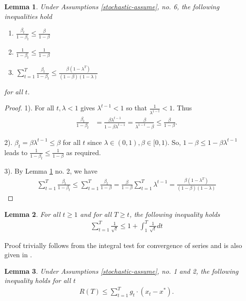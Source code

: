 \documentclass{article}
\newtheorem{lemma}{Lemma}
\begin{document}
\begin{lemma} \label{beta-bounds}
Under Assumptions \ref{stochastic-assume}, no. 6, the following inequalities hold
\begin{enumerate}
\item $\displaystyle \frac{\beta_t}{1-\beta_t} \leq \frac{\beta}{1-\beta}$
\item $\displaystyle \frac{1}{1-\beta_t} \leq \frac{1}{1-\beta}$
\item $\displaystyle \sum_{t=1}^T \frac{\beta_t}{1-\beta_t} \le  \frac{\beta(1-\lambda^T)}{(1-\beta)(1-\lambda)}$
\end{enumerate}
for all $t$.
\end{lemma}
\begin{proof}
1). 
For all $t, \lambda < 1$ gives $\lambda^{t-1} < 1$ so that $\frac{1}{\lambda^{1-t}} < 1$. Thus
\begin{align*}
\frac{\beta_t}{1-\beta_t} &= \frac{\beta \lambda^{t-1}}{1-\beta \lambda^{t-1}} = \frac{\beta}{\lambda^{1-t} - \beta} \leq \frac{\beta}{1-\beta}.
\end{align*}

2). $\beta_t = \beta \lambda^{t-1} \le \beta$ for all $t$ since $\lambda \in (0,1), \beta \in [0,1)$. So, $1-\beta \le 1-\beta \lambda^{t-1}$ leads to 
$\displaystyle \frac{1}{1-\beta_t} \leq \frac{1}{1-\beta}$ as required.

3). By Lemma \ref{beta-bounds} no. 2, we have
\begin{align*}
\sum_{t=1}^T \frac{\beta_t}{1-\beta_t} \leq \sum_{t=1}^T \frac{\beta_t}{1-\beta} = \frac{\beta }{1-\beta} \sum_{t=1}^T \lambda^{t-1} 
= \frac{\beta(1-\lambda^T)}{(1-\beta)(1-\lambda)}
\end{align*}
\end{proof}

\begin{lemma}\label{intergral_test}
For all $t \ge 1$ and for all $T \ge t$, the following inequality holds
\begin{align}
\sum_{t=1}^T \frac{1}{\sqrt{t}} \le 1 + \int_1^T \frac{1}{\sqrt{t}}dt
\end{align}
\end{lemma}
Proof trivially follows from the integral test for convergence of series and is also given in \cite{bock2018improvement}.

\begin{lemma}
Under Assumptions \ref{stochastic-assume}, no. 1 and 2, the following inequality holds for all $t$
\begin{align}
R(T) \le \sum_{t=1}^T g_t \cdot  (x_t - x^*).
\end{align}
\end{lemma}
\end{document}
